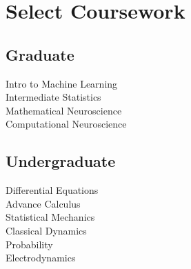 \documentclass[]{deedy-resume-openfont}
\begin{document}
\begin{minipage}[t]{0.33\textwidth}


\section{Select Coursework}
\subsection{Graduate}
\regdescript
Intro to Machine Learning \\
Intermediate Statistics \\
Mathematical Neuroscience\\
Computational Neuroscience\\
\sectionsep

\subsection{Undergraduate}
 \regdescript
 Differential Equations\\
 Advance Calculus \\
 Statistical Mechanics\\
 Classical Dynamics\\
 Probability\\
 Electrodynamics\\
 

\sectionsep



\end{minipage}
\end{document}
